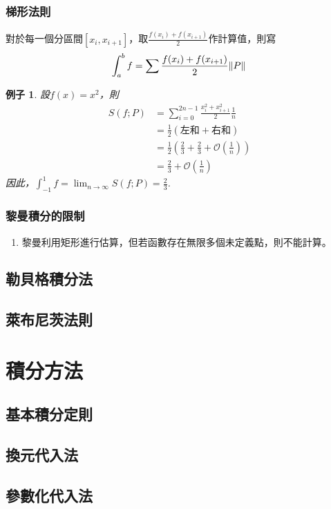\documentclass[12pt]{article}
\newtheorem*{example}{例子}
\begin{document}
    \subsubsection*{梯形法則}
    對於每一個分區間$[x_i,x_{i+1}]$，取$\frac{f(x_i)+f(x_{i+1})}{2}$作計算值，則寫$$\int_a^b f=\sum \frac{f(x_i)+f(x_{i+1})}{2}\norm*{P}$$

    \begin{example}
        設$f(x)=x^2$，則\begin{align*}
            S(f;P)&=\sum_{i=0}^{2n-1} \frac{x_i^2+x_{i+1}^2}{2} \frac{1}{n}\\
            &=\frac{1}{2}(\textrm{左和}+\textrm{右和})\\
            &=\frac{1}{2}(\frac{2}{3}+\frac{2}{3}+\mathcal{O}(\frac{1}{n}))\\
            &=\frac{2}{3}+\mathcal{O}(\frac{1}{n})
        \end{align*}
        因此，$\displaystyle\int_{-1}^1 f = \lim_{n\to \infty}S(f;P)=\frac{2}{3}$.
    \end{example}

    \subsubsection*{黎曼積分的限制}

    \begin{enumerate}
        \item 黎曼利用矩形進行估算，但若函數存在無限多個未定義點，則不能計算。
    \end{enumerate}
    \subsection*{勒貝格積分法}
    \subsection*{萊布尼茨法則}
    \section*{積分方法}
    \subsection*{基本積分定則}
    \subsection*{換元代入法}
    \subsection*{參數化代入法}
\end{document}
